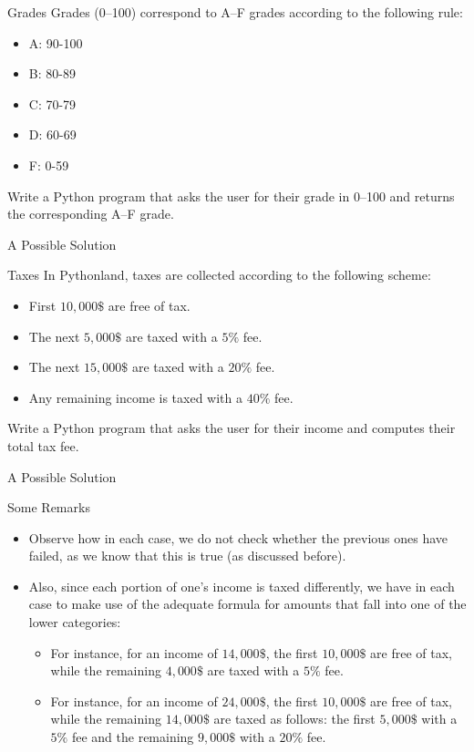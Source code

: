 \documentclass[aspectratio=169, 12pt, xcolor=table]{beamer}
\begin{document}
	\begin{frame}{Grades}
		Grades (0--100) correspond to A--F grades according to the following rule:
		\begin{itemize}
			\item A: 90-100
			\item B: 80-89
			\item C: 70-79
			\item D: 60-69
			\item F: 0-59
		\end{itemize}
		Write a Python program that asks the user for their grade in 0--100 and returns the corresponding A--F grade.
	\end{frame}

	\begin{frame}{A Possible Solution}
		
	\end{frame}
	
	\begin{frame}{Taxes}
		In Pythonland, taxes are collected according to the following scheme:
		\begin{itemize}
			\item First $10,000\$$ are free of tax.
			\item The next $5,000\$$ are taxed with a $5\%$ fee.
			\item The next $15,000\$$ are taxed with a $20\%$ fee.
			\item Any remaining income is taxed with a $40\%$ fee.
		\end{itemize}
		Write a Python program that asks the user for their income and computes their total tax fee.
	\end{frame}

	\begin{frame}{A Possible Solution}
		
	\end{frame}

	\begin{frame}{Some Remarks}
		\begin{itemize}
			\item Observe how in each case, we do not check whether the previous ones have failed, as we know that this is true (as discussed before).
			\item Also, since each portion of one's income is taxed differently, we have in each case to make use of the adequate formula for amounts that fall into one of the lower categories:
			\begin{itemize}
				\item For instance, for an income of $14,000\$$, the first $10,000\$$ are free of tax, while the remaining $4,000\$$ are taxed with a $5\%$ fee.
				\item For instance, for an income of $24,000\$$, the first $10,000\$$ are free of tax, while the remaining $14,000\$$ are taxed as follows: the first $5,000\$$ with a $5\%$ fee and the remaining $9,000\$$ with a $20\%$ fee.
			\end{itemize}
		\end{itemize}
	\end{frame}
\end{document}
